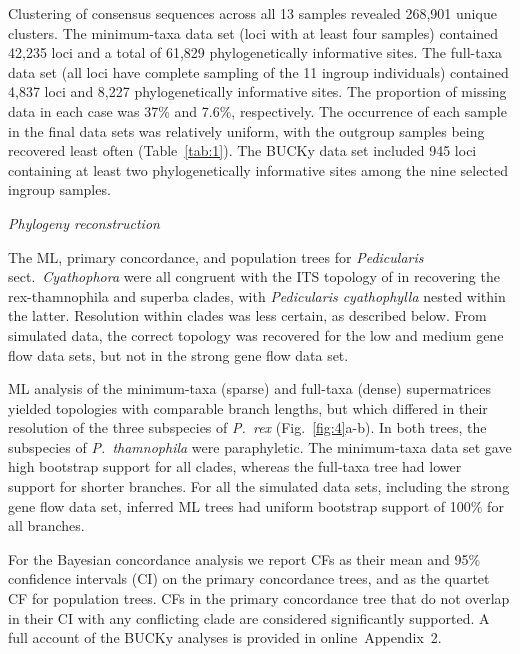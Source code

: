 \documentclass[12pt,letterpaper]{article}
\renewcommand{\subsection}[1]{%
\bigskip
\begin{center}
\begin{large}
\normalfont\itshape #1
\end{large}
\end{center}}
\begin{document}
Clustering of consensus sequences across all 13 samples revealed
268,901 unique clusters. %
The minimum-taxa data set (loci with at least four samples) contained
42,235 loci and a total of 61,829 phylogenetically informative
sites. The full-taxa data set (all loci have complete sampling of the
11 ingroup individuals) contained 4,837 loci and 8,227
phylogenetically informative sites. The proportion of missing data in
each case was 37\% and 7.6\%, respectively. The occurrence of each
sample in the final data sets was relatively uniform, with the
outgroup samples being recovered least often (Table~\ref{tab:1}). The
BUCKy data set included 945 loci containing at least two
phylogenetically informative sites among the nine selected ingroup
samples.
 
\subsection{Phylogeny reconstruction}
The ML, primary concordance, and population trees for
\emph{Pedicularis} sect.\ \emph{Cyathophora} were all congruent with
the ITS topology of \cite{ree_phylogeny_2005} in recovering the
rex-thamnophila and superba clades, with \emph{Pedicularis
  cyathophylla} nested within the latter. Resolution within clades was
less certain, as described below. From simulated data, the correct
topology was recovered for the low and medium gene flow data sets, but
not in the strong gene flow data set.

ML analysis of the minimum-taxa (sparse) and full-taxa (dense)
supermatrices yielded topologies with comparable branch lengths, but
which differed in their resolution of the three subspecies of
\emph{P.~rex} (Fig.~\ref{fig:4}a-b). In both trees, the subspecies of
\emph{P.~thamnophila} were paraphyletic.  The minimum-taxa data set
gave high bootstrap support for all clades, whereas the full-taxa tree
had lower support for shorter branches. For all the simulated data
sets, including the strong gene flow data set, inferred ML trees had
uniform bootstrap support of 100\% for all branches.

For the Bayesian concordance analysis we report CFs as their mean and
95\% confidence intervals (CI) on the primary concordance trees, and
as the quartet CF for population trees. CFs in the primary concordance
tree that do not overlap in their CI with any conflicting clade are
considered significantly supported.  A full account of the BUCKy
analyses is provided in online~Appendix~2. %
\end{document}
